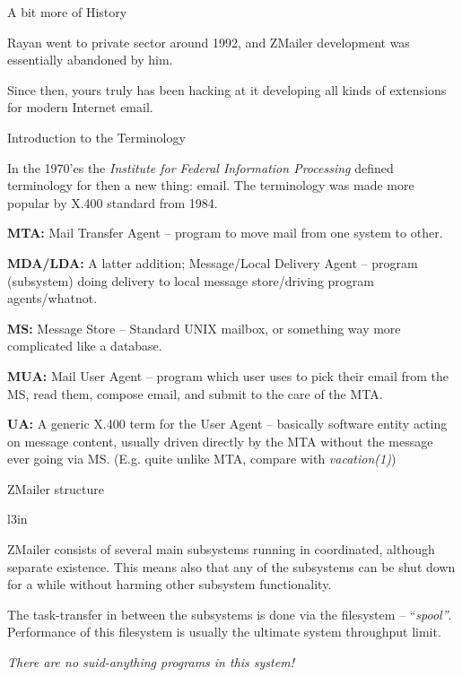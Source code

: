 \documentclass[a4paper,landscape]{slides}
\newcommand{\ZM}{ZMailer}
\begin{document}
\begin{slide}
\centerline{\large A bit more of History}


Rayan went to private sector around 1992, and \ZM{} development
was essentially abandoned by him.

Since then, yours truly has been hacking at it developing all kinds
of extensions for modern Internet email.

\vfill

\end{slide}



\begin{slide}

\centerline{\large Introduction to the Terminology}
\small

In the 1970'es the {\em Institute for Federal Information Processing}
defined terminology for then a new thing: email.
The terminology was made more popular by X.400 standard from 1984.

{\bf MTA:}
Mail Transfer Agent -- program to move mail from one system to other.

{\bf MDA/LDA:}
A latter addition; Message/Local Delivery Agent -- program (subsystem)
doing delivery to local message store/driving program agents/whatnot.

{\bf MS:}
Message Store -- Standard UNIX mailbox, or something way more complicated
like a database.

{\bf MUA:}
Mail User Agent -- program which user uses to pick their email from
the MS, read them, compose email, and submit to the care of the MTA.

{\bf UA:} A generic X.400 term for the User Agent -- basically
software entity acting on message content, usually driven directly
by the MTA without the message ever going via MS.
(E.g. quite unlike MTA, compare with {\em vacation(1)})

\vfill

\end{slide}



\begin{slide}

\centerline{\large \ZM{} structure}

\begin{wrapfigure}[11]{l}{3in}
\end{wrapfigure}

\ZM{} consists of several main subsystems running in coordinated,
although separate existence.  This means also that any of the subsystems
can be shut down for a while without harming other subsystem functionality.

The task-transfer in between the subsystems is done via
the filesystem -- {``\it spool''}.
Performance of this filesystem is usually the ultimate system throughput limit.

\vfill
\centerline{\em There are no suid-anything programs in this system!}

\vfill

\end{slide}
\end{document}
